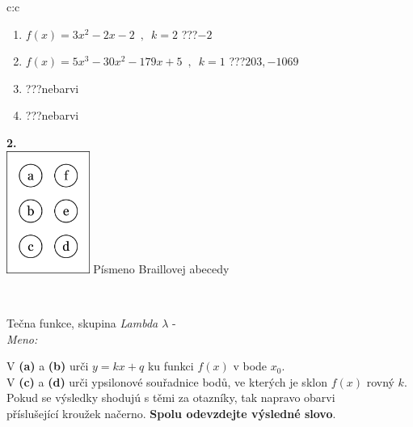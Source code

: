 \documentclass[10pt]{report}
\begin{document}
\begin{tabular}{c:c}
\begin{minipage}[c][104.5mm][t]{0.5\linewidth}
\begin{center}
\begin{minipage}{0.79\linewidth}
\begin{center}
\begin{varwidth}{\linewidth}
\begin{enumerate}
\item $f(x)=3x^2-2x-2\enspace , \enspace k=2$\quad \dotfill\; ???\;\dotfill \quad $-2$
\item $f(x)=5x^3-30x^2-179x+5\enspace , \enspace k=1$\quad \dotfill\; ???\;\dotfill \quad $203 , -1069$
\item \quad \dotfill\; ???\;\dotfill \quad nebarvi
\item \quad \dotfill\; ???\;\dotfill \quad nebarvi
\end{enumerate}
\end{varwidth}
\end{center}
\end{minipage}
\begin{minipage}{0.20\linewidth}
\begin{center}
{\Huge\bfseries 2.} \\[2mm]
\includegraphics[height=40mm]{../images/braille.png}
{\small Písmeno Braillovej abecedy}
\end{center}
\end{minipage}
\end{center}
\end{minipage}
\\ \hdashline
\begin{minipage}[c][104.5mm][t]{0.5\linewidth}
\begin{center}
\vspace{7mm}
{\huge Tečna funkce, skupina \textit{Lambda $\lambda$} -}\\[5mm]
\textit{Meno:}\phantom{xxxxxxxxxxxxxxxxxxxxxxxxxxxxxxxxxxxxxxxxxxxxxxxxxxxxxxxxxxxxxxxxx}\\[5mm]
\begin{minipage}{0.95\linewidth}
\begin{center}
V \textbf{(a)} a \textbf{(b)} urči  $y = kx + q$ ku funkci $f(x)$ v bode $x_0$.\\V \textbf{(c)} a \textbf{(d)} urči ypsilonové souřadnice bodů, ve kterých je sklon $f(x)$ rovný $k$.\\Pokud se výsledky shodujú s těmi za otazníky, tak napravo obarvi\\příslušející kroužek načerno. \textbf{Spolu odevzdejte výsledné slovo}.

\end{center}
\end{minipage}
\end{center}
\end{minipage}
\end{tabular}
\end{document}
